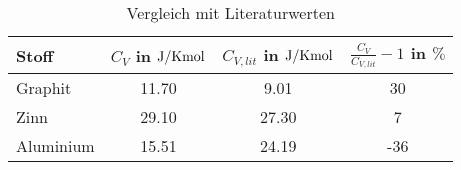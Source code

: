   \begin{table}
    \centering
    \begin{tabular}{l S S S}
        \toprule
      Stoff  &{$C_V$ in $\si{\joule \per {\kelvin \mol}}$} &  {$C_{V,lit}$ in $\si{\joule \per {\kelvin \mol}}$} &  {$\frac{C_V}{C_{V,lit}}-1$ in $\%$}  \\
        \midrule
      Graphit & 11.70 & 9.01 & 30 \\
      Zinn &  29.10 & 27.30 & 7 \\
      Aluminium & 15.51 & 24.19 & -36  \\

    \end{tabular}
    \caption{Vergleich mit Literaturwerten}
    \label{tab: comp}
  \end{table}

